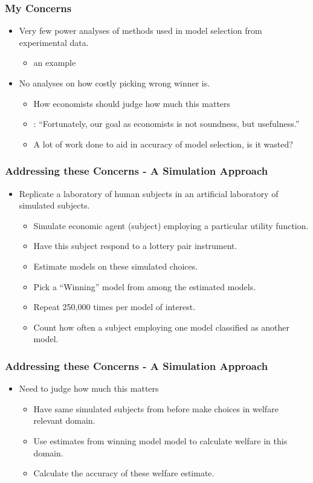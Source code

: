 \documentclass{beamer}
\begin{document}
\begin{frame}
\frametitle{My Concerns}
\begin{itemize}
	\item Very few power analyses of methods used in model selection from experimental data.
		\begin{itemize}
			\item \textcite{Wilcox2015} an example
		\end{itemize}
	\item No analyses on how costly picking wrong winner is.
		\begin{itemize}
			\item How economists should judge how much this matters
			\item \textcite[25]{Leamer2012}: \enquote{Fortunately, our goal as economists is not soundness, but usefulness.}
			\item A lot of work done to aid in accuracy of model selection, is it wasted?
		\end{itemize}
\end{itemize}
\end{frame}

\begin{frame}
\frametitle{Addressing these Concerns - A Simulation Approach}
\begin{itemize}
	\item Replicate a laboratory of human subjects in an artificial laboratory of simulated subjects.
		\begin{itemize}
			\item Simulate economic agent (subject) employing a particular utility function.
			\item Have this subject respond to a lottery pair instrument.
			\item Estimate models on these simulated choices.
			\item Pick a \enquote{Winning} model from among the estimated models.
			\item Repeat 250,000 times per model of interest.
			\item Count how often a subject employing one model classified as another model.
		\end{itemize}
\end{itemize}
\end{frame}

\begin{frame}
\frametitle{Addressing these Concerns - A Simulation Approach}
\begin{itemize}
	\item Need to judge how much this matters
		\begin{itemize}
			\item Have same simulated subjects from before make choices in welfare relevant domain.
			\item Use estimates from winning model model to calculate welfare in this domain.
			\item Calculate the accuracy of these welfare estimate.
		\end{itemize}
\end{itemize}
\end{frame}
\end{document}
